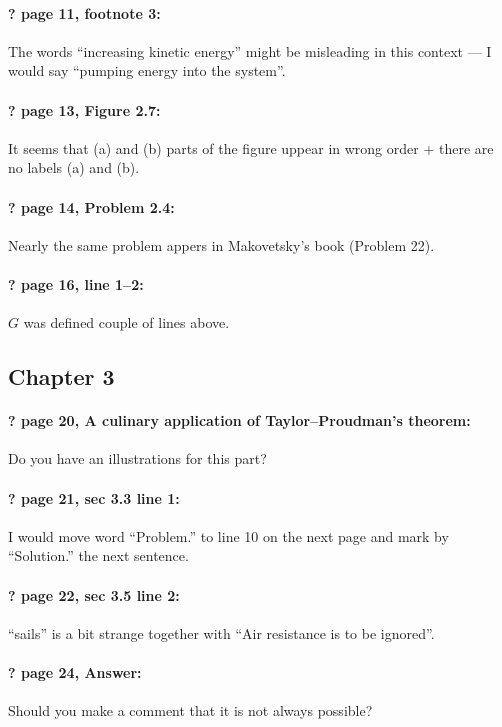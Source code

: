 \documentclass[twoside]{article}
\begin{document}
\paragraph{? page 11, footnote 3:} The words ``increasing kinetic energy'' might be misleading in this context --- I would say ``pumping energy into the system''.

\paragraph{? page 13, Figure 2.7:} It seems that (a) and (b) parts of the figure uppear in wrong order + there are no labels (a) and (b).

\paragraph{? page 14, Problem 2.4:} Nearly the same problem appers in Makovetsky’s book (Problem 22).

\paragraph{? page 16, line 1--2:} $G$ was defined couple of lines above.

\subsection*{Chapter 3}

\paragraph{? page 20, A culinary application of Taylor--Proudman’s theorem:} Do you have an illustrations for this part?

\paragraph{? page 21, sec 3.3 line 1:} I would move word ``Problem.'' to line 10 on the next page and  mark by ``Solution.'' the next sentence.

\paragraph{? page 22, sec 3.5 line 2:} ``sails'' is a bit strange together with ``Air resistance
is to be ignored''.

\paragraph{? page 24, Answer:} Should you make a comment that it is not always possible?
\end{document}
